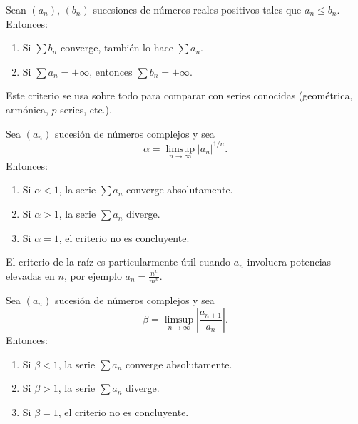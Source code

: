\begin{proposition}
    Sean $(a_n)$, $(b_n)$ sucesiones de números reales positivos tales que $a_n \leq b_n$. Entonces:
    \begin{enumerate}
        \item Si $\sum b_n$ converge, también lo hace $\sum a_n$.
        \item Si $\sum a_n = +\infty$, entonces $\sum b_n = +\infty$.
    \end{enumerate}
\end{proposition}

Este criterio se usa sobre todo para comparar con series conocidas (geométrica, armónica, $p$-series, etc.).  

\begin{proposition}
    Sea $(a_n)$ sucesión de números complejos y sea
    \begin{equation*}
        \alpha = \limsup_{n \to \infty} |a_n|^{1/n}.
    \end{equation*}
    Entonces:
    \begin{enumerate}
        \item Si $\alpha < 1$, la serie $\sum a_n$ converge absolutamente.
        \item Si $\alpha > 1$, la serie $\sum a_n$ diverge.
        \item Si $\alpha = 1$, el criterio no es concluyente.
    \end{enumerate}
\end{proposition}

El criterio de la raíz es particularmente útil cuando $a_n$ involucra potencias elevadas en $n$, por ejemplo $a_n = \frac{n^k}{m^n}$.  

\begin{proposition}
    Sea $(a_n)$ sucesión de números complejos y sea
    \begin{equation*}
        \beta = \limsup_{n \to \infty} \left|\frac{a_{n+1}}{a_n}\right|.
    \end{equation*}
    Entonces:
    \begin{enumerate}
        \item Si $\beta < 1$, la serie $\sum a_n$ converge absolutamente.
        \item Si $\beta > 1$, la serie $\sum a_n$ diverge.
        \item Si $\beta = 1$, el criterio no es concluyente.
    \end{enumerate}
\end{proposition}

